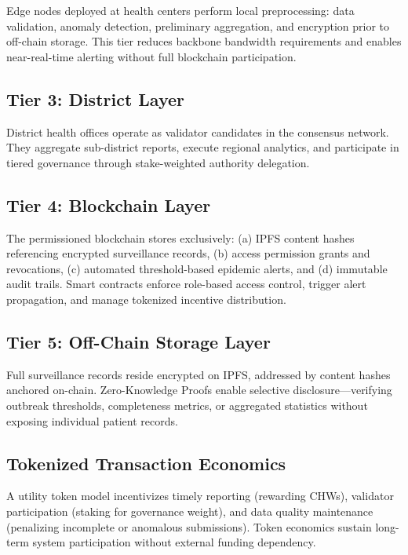 \documentclass[AMA,LATO1COL]{WileyNJDv5}
\begin{document}
Edge nodes deployed at health centers perform local preprocessing: data validation, anomaly detection, preliminary aggregation, and encryption prior to off-chain storage. This tier reduces backbone bandwidth requirements and enables near-real-time alerting without full blockchain participation.

\subsection{Tier 3: District Layer}

District health offices operate as validator candidates in the consensus network. They aggregate sub-district reports, execute regional analytics, and participate in tiered governance through stake-weighted authority delegation.

\subsection{Tier 4: Blockchain Layer}

The permissioned blockchain stores exclusively: (a) IPFS content hashes referencing encrypted surveillance records, (b) access permission grants and revocations, (c) automated threshold-based epidemic alerts, and (d) immutable audit trails. Smart contracts enforce role-based access control, trigger alert propagation, and manage tokenized incentive distribution.

\subsection{Tier 5: Off-Chain Storage Layer}

Full surveillance records reside encrypted on IPFS, addressed by content hashes anchored on-chain. Zero-Knowledge Proofs enable selective disclosure---verifying outbreak thresholds, completeness metrics, or aggregated statistics without exposing individual patient records.

\subsection{Tokenized Transaction Economics}

A utility token model incentivizes timely reporting (rewarding CHWs), validator participation (staking for governance weight), and data quality maintenance (penalizing incomplete or anomalous submissions). Token economics sustain long-term system participation without external funding dependency.
\end{document}

